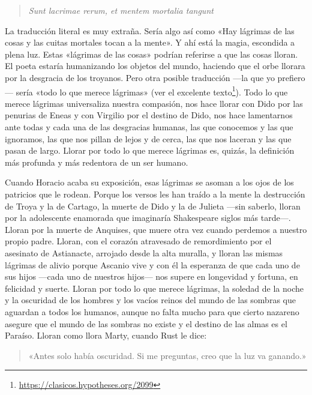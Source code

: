 \documentclass[11pt,a4paper]{article}
\begin{document}
\begin{verse}
\emph{Sunt lacrimae rerum, et mentem mortalia tangunt}
\end{verse}

La traducción literal es muy extraña. Sería algo así como «Hay lágrimas de las cosas y las cuitas mortales tocan a la mente». Y ahí está la magia, escondida a plena luz. Estas «lágrimas de las cosas» podrían referirse a que las cosas lloran. El poeta estaría humanizando los objetos del mundo, haciendo que el orbe llorara por la desgracia de los troyanos. Pero otra posible traducción ---la que yo prefiero--- sería «todo lo que merece lágrimas» (ver el excelente texto\footnote{\url{https://clasicos.hypotheses.org/2099}}). Todo lo que merece lágrimas universaliza nuestra compasión, nos hace llorar con Dido por las penurias de Eneas y con Virgilio por el destino de Dido, nos hace lamentarnos ante todas y cada una de las desgracias humanas, las que conocemos y las que ignoramos, las que nos pillan de lejos y de cerca, las que nos laceran y las que pasan de largo. Llorar por todo lo que merece lágrimas es, quizás, la definición más profunda y más redentora de un ser humano.

Cuando Horacio acaba su exposición, esas lágrimas se asoman a los ojos de los patricios que le rodean. Porque los versos les han traído a la mente la destrucción de Troya y la de Cartago, la muerte de Dido y la de Julieta ---sin saberlo, lloran por la adolescente enamorada que imaginaría Shakespeare siglos más tarde---. Lloran por la muerte de Anquises, que muere otra vez cuando perdemos a nuestro propio padre. Lloran, con el corazón atravesado de remordimiento por el asesinato de Astianacte, arrojado desde la alta muralla, y lloran las mismas lágrimas de alivio porque Ascanio vive y con él la esperanza de que cada uno de sus hijos ---cada uno de nuestros hijos--- nos supere en longevidad y fortuna, en felicidad y suerte. Lloran por todo lo que merece lágrimas, la soledad de la noche y la oscuridad de los hombres y los vacíos reinos del mundo de las sombras que aguardan a todos los humanos, aunque no falta mucho para que cierto nazareno asegure que el mundo de las sombras no existe y el destino de las almas es el Paraíso. Lloran como llora Marty, cuando Rust le dice:

\begin{quotation}
«Antes solo había oscuridad. Si me preguntas, creo que la luz va ganando.»
\end{quotation}
\end{document}
